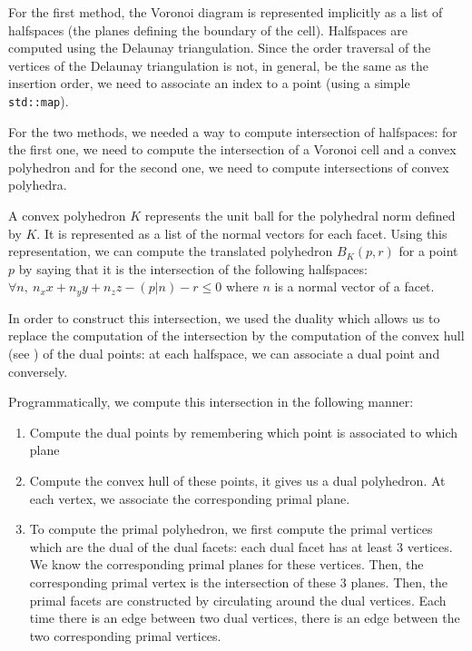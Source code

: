 For the first method, the Voronoi diagram is represented implicitly as a list of
halfspaces (the planes defining the boundary of the cell). Halfspaces are
computed using the Delaunay triangulation. Since the order traversal of the vertices
of the Delaunay triangulation is not, in general, be the same as the insertion
order, we need to associate an index to a point (using a simple
\texttt{std::map}).

For the two methods, we needed a way to compute intersection of halfspaces: for
the first one, we need to compute the intersection of a Voronoi cell and a
convex polyhedron and for the second one, we need to compute intersections of
convex polyhedra.

A convex polyhedron $ K $ represents the unit ball for the polyhedral norm
defined by $ K $. It is represented as a list of the normal vectors for each
facet. Using this representation, we can compute the translated polyhedron $
B_K(p, r) $ for a point $ p $ by saying that it is the intersection of the
following halfspaces: $ \forall n,~ n_x x + n_y y + n_z z - (p | n) - r \leq 0 $
where $ n $ is a normal vector of a facet.

In order to construct this intersection, we used the duality which allows us to
replace the computation of the intersection by the computation of the convex
hull (see \cite{preparata1979finding}) of the dual points: at each halfspace, we
can associate a dual point and conversely.

Programmatically, we compute this intersection in the following manner:
\begin{enumerate}
    \item Compute the dual points by remembering which point is associated to
        which plane
    \item Compute the convex hull of these points, it gives us a dual
        polyhedron. At each vertex, we associate the corresponding primal plane.
    \item To compute the primal polyhedron, we first compute the primal vertices
        which are the dual of the dual facets: each dual facet has at least 3
        vertices. We know the corresponding primal planes for these vertices.
        Then, the corresponding primal vertex is the intersection of these 3
        planes. Then, the primal facets are constructed by circulating around
        the dual vertices. Each time there is an edge between two dual vertices,
        there is an edge between the two corresponding primal vertices.
\end{enumerate}

